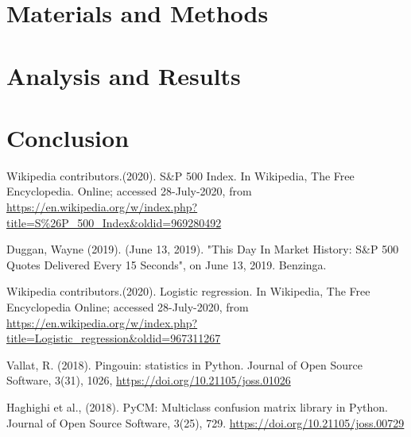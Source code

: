 \documentclass[12pt]{article}
\begin{document}
\section{Materials and Methods}


\section{Analysis and Results}







\section{Conclusion}



\begin{thebibliography}{999}

	Wikipedia contributors.(2020). S\&P 500 Index. In Wikipedia, The Free Encyclopedia. Online; accessed 28-July-2020, from {\url{https://en.wikipedia.org/w/index.php?title=S\%26P_500_Index&oldid=969280492}}
	
	Duggan, Wayne (2019). (June 13, 2019). "This Day In Market History: S\&P 500 Quotes Delivered Every 15 Seconds", on June 13, 2019. Benzinga.
	
	Wikipedia contributors.(2020). Logistic regression. In Wikipedia, The Free Encyclopedia Online; accessed 28-July-2020, from  {\url{https://en.wikipedia.org/w/index.php?title=Logistic\_regression\&oldid=967311267}}
	
	Vallat, R. (2018). Pingouin: statistics in Python. Journal of Open Source Software, 3(31), 1026, {\url{https://doi.org/10.21105/joss.01026}}
	
	Haghighi et al., (2018). PyCM: Multiclass confusion matrix library in Python. Journal of Open Source Software, 3(25), 729.
	{\url{https://doi.org/10.21105/joss.00729}}
\end{thebibliography}
\end{document}
